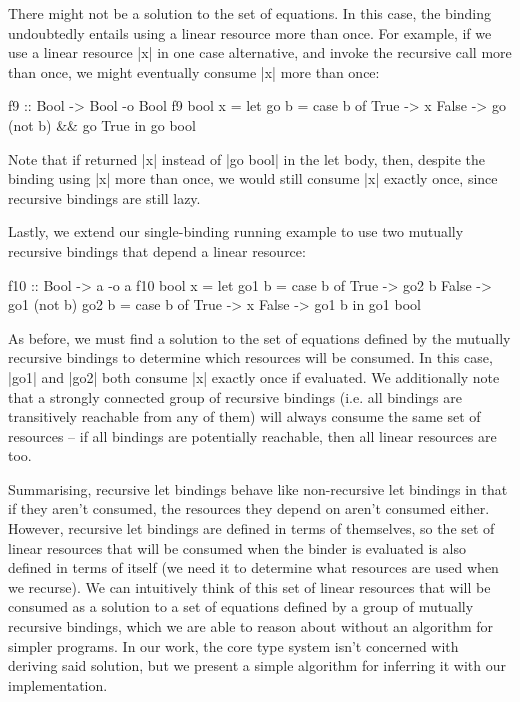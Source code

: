 \documentclass[acmsmall, screen, review]{acmart}
\newcommand{\parawith}[1]{\paragraph{\emph{#1}}}
\begin{document}
There might not be a solution to the set of equations. In this case, the
binding undoubtedly entails using a linear resource more than once. For
example, if we use a linear resource |x| in one case alternative, and invoke
the recursive call more than once, we might eventually consume |x| more than
once:
%
\begin{noway}
\begin{code}
f9 :: Bool -> Bool -o Bool
f9 bool x =
  let go b
        = case b of
           True -> x
           False -> go (not b) && go True
  in go bool
\end{code}
\end{noway}
Note that if returned |x| instead of |go bool| in the let body, then, despite
the binding using |x| more than once, we would still consume |x| exactly once,
since recursive bindings are still lazy.

Lastly, we extend our single-binding running example to use two mutually recursive bindings that
depend a linear resource:
\begin{notyet}
\begin{code}
f10 :: Bool -> a -o a
f10 bool x =
  let go1 b
        = case b of
           True -> go2 b
           False -> go1 (not b)
      go2 b
        = case b of
           True -> x
           False -> go1 b
  in go1 bool
\end{code}
\end{notyet}
As before, we must find a solution to the set of equations defined by the
mutually recursive bindings to determine which resources will be consumed.
In this case, |go1| and |go2| both consume |x| exactly once if evaluated.
We additionally note that a strongly connected group of recursive bindings
(i.e. all bindings are transitively reachable from any of them) will always
consume the same set of resources -- if all bindings are potentially reachable,
then all linear resources are too.

Summarising, recursive let bindings behave like non-recursive let bindings in
that if they aren't consumed, the resources they depend on aren't consumed
either.  However, recursive let bindings are defined in terms of themselves, so
the set of linear resources that will be consumed when the binder is evaluated
is also defined in terms of itself (we need it to determine what resources are
used when we recurse). We can intuitively think of this set of linear resources
that will be consumed as a solution to a set of equations defined by a group of
mutually recursive bindings, which we are able to reason about without an
algorithm for simpler programs. In our work, the core type system isn't
concerned with deriving said solution, but we present a simple algorithm for
inferring it with our implementation.
\end{document}
